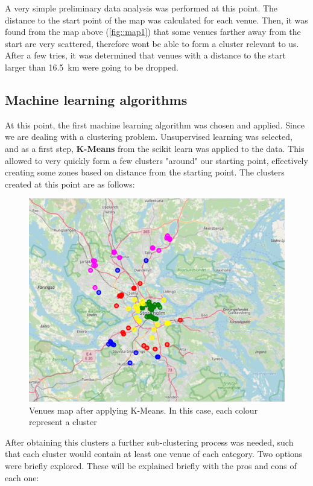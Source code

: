 \documentclass{article}
\begin{document}
		A very simple preliminary data analysis was performed at this point. The distance to the start point of the map was calculated for each venue. Then, it was found from the map above (\ref{fig::map1}) that some venues farther away from the start are very scattered, therefore wont be able to form a cluster relevant to us. After a few tries, it was determined that venues with a distance to the start larger than \SI{16.5}{\kilo \meter} were going to be dropped. 
		
	\subsection{Machine learning algorithms}
		At this point, the first machine learning algorithm was chosen and applied. Since we are dealing with a clustering problem. Unsupervised learning was selected, and as a first step, \textbf{K-Means} from the scikit learn was applied to the data. This allowed to very quickly form a few clusters "around" our starting point, effectively creating some zones based on distance from the starting point. The clusters created at this point are as follows:
		\begin{figure}[H]
			\centering
			\includegraphics[width=\textwidth]{img/map2.jpg}
			\caption{Venues map after applying K-Means. In this case, each colour represent a cluster}
			\label{fig::map2}
		\end{figure}
		
		After obtaining this clusters a further sub-clustering process was needed, such that each cluster would contain at least one venue of each category. Two options were briefly explored. These will be explained briefly with the pros and cons of each one:
		
\end{document}
